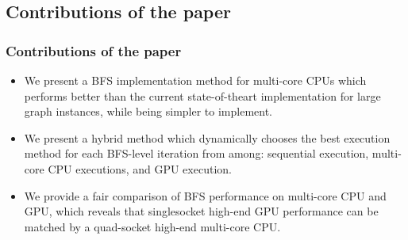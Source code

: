 \documentclass{beamer}
\begin{document}
\begin{frame}
\subsection{Contributions of the paper}
\frametitle{Contributions of the paper}
\begin{itemize}
\item We present a BFS implementation method for multi-core
CPUs which performs better than the current state-of-theart
implementation for large graph instances, while being simpler to implement.
\item We present a hybrid method which dynamically chooses
the best execution method for each BFS-level iteration
from among: sequential execution, multi-core CPU executions,
and GPU execution.
\item We provide a fair comparison of BFS performance on
multi-core CPU and GPU, which reveals that singlesocket
high-end GPU performance can be matched by
a quad-socket high-end multi-core CPU.
\end{itemize}

\end{frame}
\end{document}
